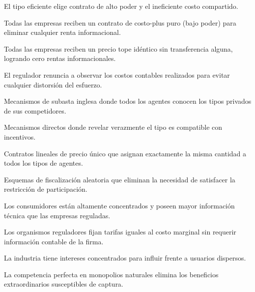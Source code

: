 \begin{opts}
    \item El tipo eficiente elige contrato de alto poder y el ineficiente costo compartido.
    \item Todas las empresas reciben un contrato de costo-plus puro (bajo poder) para eliminar cualquier renta informacional.
    \item Todas las empresas reciben un precio tope idéntico sin transferencia alguna, logrando cero rentas informacionales.
    \item El regulador renuncia a observar los costos contables realizados para evitar cualquier distorsión del esfuerzo.
\end{opts}

\begin{opts}
    \item Mecanismos de subasta inglesa donde todos los agentes conocen los tipos privados de sus competidores.
    \item Mecanismos directos donde revelar verazmente el tipo es compatible con incentivos.
    \item Contratos lineales de precio único que asignan exactamente la misma cantidad a todos los tipos de agentes.
    \item Esquemas de fiscalización aleatoria que eliminan la necesidad de satisfacer la restricción de participación.
\end{opts}

\begin{opts}
    \item Los consumidores están altamente concentrados y poseen mayor información técnica que las empresas reguladas.
    \item Los organismos reguladores fijan tarifas iguales al costo marginal sin requerir información contable de la firma.
    \item La industria tiene intereses concentrados para influir frente a usuarios dispersos.
    \item La competencia perfecta en monopolios naturales elimina los beneficios extraordinarios susceptibles de captura.
\end{opts}

